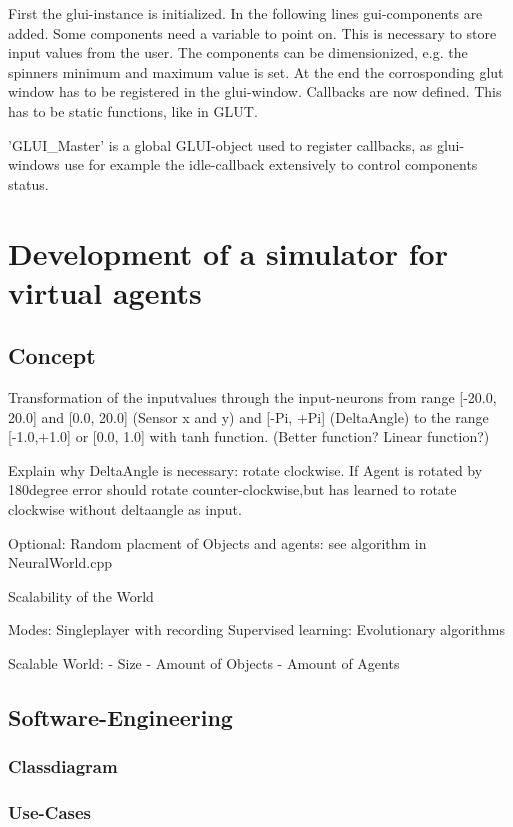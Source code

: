 \documentclass[10pt,a4paper,DIV=11]{scrreprt}
\begin{document}
First the glui-instance is initialized. In the following lines gui-components are added. Some components need a variable to point on. This is necessary to store input values from the user. The components can be dimensionized, e.g. the spinners minimum and maximum value is set.
At the end the corrosponding glut window has to be registered in the glui-window.
Callbacks are now defined. This has to be static functions, like in GLUT.

'GLUI\_Master' is a global GLUI-object used to register callbacks, as glui-windows use for example the idle-callback extensively to control components status.

\chapter{Development of a simulator for virtual agents}

\section{Concept}


Transformation of the inputvalues through the input-neurons from range [-20.0, 20.0] and [0.0, 20.0] (Sensor x and y) and [-Pi, +Pi] (DeltaAngle) to the range [-1.0,+1.0] or [0.0, 1.0] with tanh function. (Better function? Linear function?)

Explain why DeltaAngle is necessary:
rotate clockwise. If Agent is rotated by 180degree error should rotate counter-clockwise,but
has learned to rotate clockwise without deltaangle as input.


Optional: Random placment of Objects and agents: see algorithm in NeuralWorld.cpp



Scalability of the World


Modes:
Singleplayer with recording
Supervised learning:
Evolutionary algorithms

Scalable World:
- Size
- Amount of Objects
- Amount of Agents

\section{Software-Engineering}

\subsection{Classdiagram}

\subsection{Use-Cases}
\end{document}
